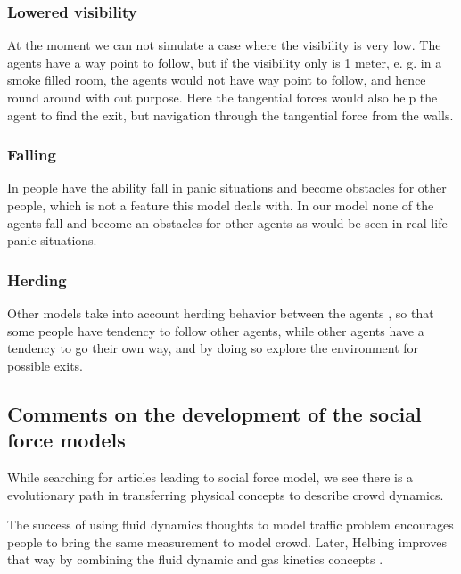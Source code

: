 \subsubsection{Lowered visibility}
At the moment we can not simulate a case where the visibility is very low. The 
agents have a way point to follow, but if the visibility only is 1 meter, e. 
g. in a smoke filled room, the  agents would not have way point to follow, and 
hence round around with out purpose. Here the tangential forces would also 
help the agent to find the exit, but navigation through the tangential force 
from the walls. %

\subsubsection{Falling}
In \cite{HiDAC} people have the ability fall in panic situations and become 
obstacles for other people, which is not a feature this model deals with. In 
our model none of the agents fall and become an obstacles for other agents as 
would be seen in real life panic situations.

\subsubsection{Herding}
Other models take into account herding behavior between the agents  
\cite{helbing00}, so that some people have tendency to follow other agents, 
while other agents have a tendency to go their own way,  and by doing so 
explore the environment for possible exits.

\subsection{Comments on the development of the social force models}
\label{subsec:development}
While searching for articles leading to social force model, we see there is a 
evolutionary path in transferring physical concepts to describe crowd dynamics.

The success of using fluid dynamics thoughts to model traffic problem encourages 
people to bring the same measurement to model crowd. Later, Helbing improves that 
way by combining the fluid dynamic and gas kinetics concepts \cite{social-force}. 


